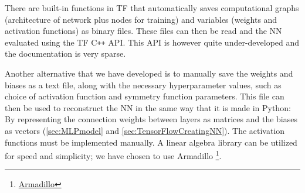 \documentclass[twoside,english]{uiofysmaster}
\begin{document}
There are built-in functions in TF that automatically saves computational graphs (architecture of network plus
nodes for training) and variables (weights and activation functions) as binary files.
These files can then be read and the NN evaluated using the TF C\texttt{++} API. This API is however quite under-developed
and the documentation is very sparse. 

Another alternative that we have developed is to manually save the weights and biases
as a text file, along with the necessary hyperparameter values, such as choice of activation function and 
symmetry function parameters. This file 
can then be used to reconstruct the NN in the same way that it is made in Python: By representing
the connection weights between layers as matrices and the biases as vectors 
(\autoref{sec:MLPmodel} and \autoref{sec:TensorFlowCreatingNN}). 
The activation functions must be implemented manually. A linear algebra library can
be utilized for speed and simplicity; we have chosen to use Armadillo
\footnote{\href{http://arma.sourceforge.net/}{Armadillo}}. 
\end{document}
